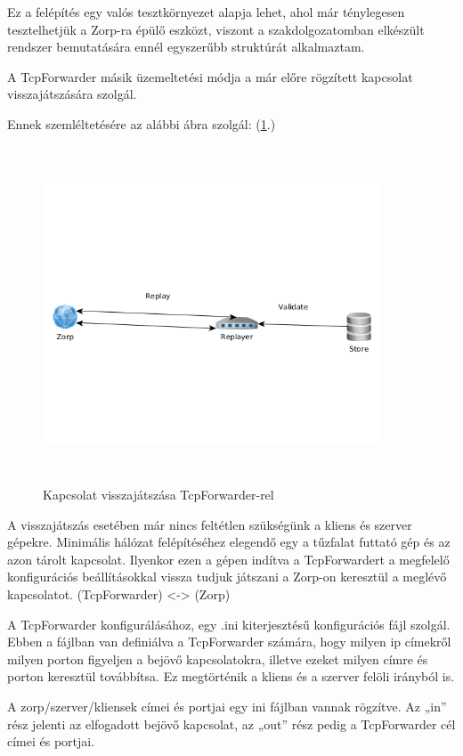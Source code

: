 \documentclass[a4paper,12pt,oneside]{report}
\begin{document}
Ez a felépítés egy valós tesztkörnyezet alapja lehet, ahol már ténylegesen tesztelhetjük a Zorp-ra épülő eszközt, viszont a szakdolgozatomban elkészült rendszer bemutatására ennél egyszerűbb struktúrát alkalmaztam.

A TcpForwarder másik üzemeltetési módja a már előre rögzített kapcsolat visszajátszására szolgál.

Ennek szemléltetésére az alábbi ábra szolgál: (\ref{fig:replay}.)

\begin{figure}[h]
  \includegraphics[width=10cm,height=10cm,keepaspectratio]{replay.png}
  \caption{Kapcsolat visszajátszása TcpForwarder-rel}
  \label{fig:replay}
\end{figure}

A visszajátszás esetében már nincs feltétlen szükségünk a kliens és szerver gépekre.
Minimális hálózat felépítéséhez elegendő egy a tűzfalat futtató gép és az azon tárolt kapcsolat. Ilyenkor ezen a gépen indítva a TcpForwardert a megfelelő konfigurációs beállításokkal vissza tudjuk játszani a Zorp-on keresztül a meglévő kapcsolatot.
(TcpForwarder) <-> (Zorp)

A TcpForwarder konfigurálásához, egy .ini kiterjesztésű konfigurációs fájl szolgál.
Ebben a fájlban van definiálva a TcpForwarder számára, hogy milyen ip címekről milyen porton figyeljen a bejövő kapcsolatokra, illetve ezeket milyen címre és porton keresztül továbbítsa. Ez megtörténik a kliens és a szerver felöli irányból is. 

A zorp/szerver/kliensek címei és portjai egy ini fájlban vannak rögzítve.
Az „in” rész jelenti az elfogadott bejövő kapcsolat, az „out” rész pedig a 
TcpForwarder cél címei és portjai.
\end{document}
